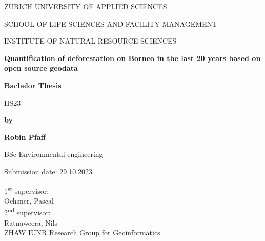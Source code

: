 \begin{titlepage}
    \centering
    {\fontsize{12}{10}\selectfont ZURICH UNIVERSITY OF APPLIED SCIENCES\par}
    {\fontsize{12}{10}\selectfont SCHOOL OF LIFE SCIENCES AND FACILITY MANAGEMENT\par}
    {\fontsize{12}{10}\selectfont INSTITUTE OF NATURAL RESOURCE SCIENCES\par}
    \vspace{6cm}
    {\fontsize{14}{16}\bfseries Quantification of deforestation on Borneo in the last 20 years based on open source geodata\par}
    {\fontsize{12}{14}\bfseries Bachelor Thesis\par}
    {\fontsize{12}{14}\selectfont HS23\par}
    \vspace{2cm}
    {\fontsize{12}{14}\bfseries by\par}
    {\fontsize{12}{14}\bfseries Robin Pfaff\par}
    {\fontsize{12}{14}\selectfont BSc Environmental engineering\par}
    \vspace{2cm}
    {\fontsize{12}{14}\selectfont Submission date: 29.10.2023\par}

    \vfill
    \begin{flushleft}
        1\textsuperscript{st} supervisor:\\
        Ochsner, Pascal\\
        2\textsuperscript{nd} supervisor:\\
        Ratnaweera, Nils\\
        ZHAW IUNR Research Group for Geoinformatics
    \end{flushleft}
\end{titlepage}

\clearpage
{}
\setcounter{page}{1}
